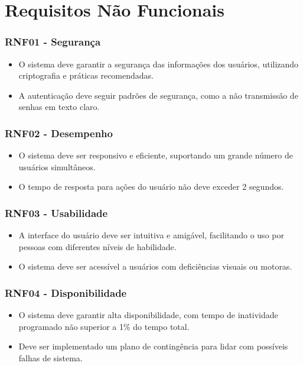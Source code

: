 \section{Requisitos Não Funcionais}

\subsubsection*{RNF01 - Segurança}
\begin{itemize}
    \item O sistema deve garantir a segurança das informações dos usuários, utilizando criptografia e práticas recomendadas.
    \item A autenticação deve seguir padrões de segurança, como a não transmissão de senhas em texto claro.
\end{itemize}

\subsubsection*{RNF02 - Desempenho}
\begin{itemize}
    \item O sistema deve ser responsivo e eficiente, suportando um grande número de usuários simultâneos.
    \item O tempo de resposta para ações do usuário não deve exceder 2 segundos.
\end{itemize}

\subsubsection*{RNF03 - Usabilidade}
\begin{itemize}
    \item A interface do usuário deve ser intuitiva e amigável, facilitando o uso por pessoas com diferentes níveis de habilidade.
    \item O sistema deve ser acessível a usuários com deficiências visuais ou motoras.
\end{itemize}

\subsubsection*{RNF04 - Disponibilidade}
\begin{itemize}
    \item O sistema deve garantir alta disponibilidade, com tempo de inatividade programado não superior a 1\% do tempo total.
    \item Deve ser implementado um plano de contingência para lidar com possíveis falhas de sistema.
\end{itemize}


